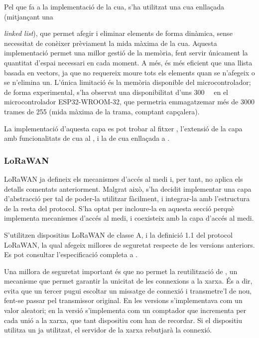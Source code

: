 \documentclass{tfgitic}[2024/07/01]
\begin{document}
Pel que fa a la implementació de la cua, s'ha utilitzat una cua enllaçada (mitjançant una {\emph{linked list}), que permet afegir i eliminar elements de forma dinàmica, sense necessitat de conèixer prèviament la mida màxima de la cua. Aquesta implementació permet una millor gestió de la memòria, fent servir únicament la quantitat d’espai necessari en cada moment. A més, és més eficient que una llista basada en vectors, ja que no requereix moure tots els elements quan se n'afegeix o se n'elimina un. L'única limitació és la memòria disponible del microcontrolador; de forma experimental, s'ha observat una disponibilitat d'uns \SI{300}{\kilo\byte} en el microcontrolador ESP32-WROOM-32, que permetria emmagatzemar més de \num{3000} trames de \SI{255}{\byte} (mida màxima de la trama, comptant capçalera).

La implementació d'aquesta capa es pot trobar al fitxer , l'extensió de la capa amb funcionalitats de cua al , i la de cua enllaçada a .
\subsubsection{LoRaWAN}
\label{subsubsec:mac_lorawan}
LoRaWAN ja defineix els mecanismes d'accés al medi i, per tant, no aplica els detalls comentats anteriorment. Malgrat això, s'ha decidit implementar una capa d'abstracció per tal de poder-la utilitzar fàcilment, i integrar-la amb l'estructura de la resta del protocol. S'ha optat per incloure-la en aquesta secció perquè implementa mecanismes d'accés al medi, i coexisteix amb la capa d'accés al medi.

S'utilitzen dispositius LoRaWAN de classe A, i la definició 1.1 del protocol LoRaWAN, la qual afegeix millores de seguretat respecte de les versions  anteriors. Es pot consultar l'especificació completa a \cite{noauthor_lorawan_2023}.

Una millora de seguretat important és que no permet la reutilització de , un mecanisme que permet garantir la unicitat de les connexions a la xarxa. És a dir, evita que un tercer pugui escoltar un missatge de connexió i transmetre'l de nou, fent-se passar pel transmissor original. En les versions  s'implementava com un valor aleatori; en la versió  s'implementa com un comptador que incrementa per cada unió a la xarxa, que tant dispositiu com  han de recordar. Si el dispositiu utilitza un  ja utilitzat, el servidor de la xarxa rebutjarà la connexió. 

}
\end{document}
